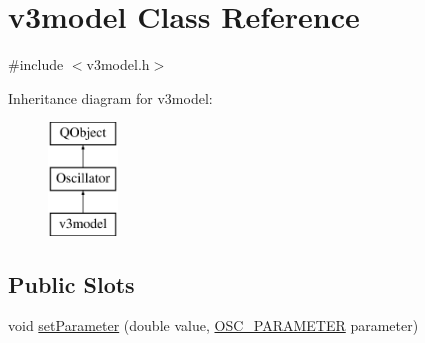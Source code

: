 \hypertarget{classv3model}{\section{v3model Class Reference}
\label{classv3model}
}


{\ttfamily \#include $<$v3model.\+h$>$}

Inheritance diagram for v3model\+:\begin{figure}[H]
\begin{center}
\leavevmode
\includegraphics[height=3.000000cm]{classv3model}
\end{center}
\end{figure}
\subsection*{Public Slots}
\begin{DoxyCompactItemize}
\item 
void \hyperlink{classv3model_a1ce58dd6384772b84a7a3c3f73a70c3f}{set\+Parameter} (double value, \hyperlink{heart_defines_8h_a79395aba577c2bc57e7ca211ff3476a6}{O\+S\+C\+\_\+\+P\+A\+R\+A\+M\+E\+T\+E\+R} parameter)
\end{DoxyCompactItemize}
